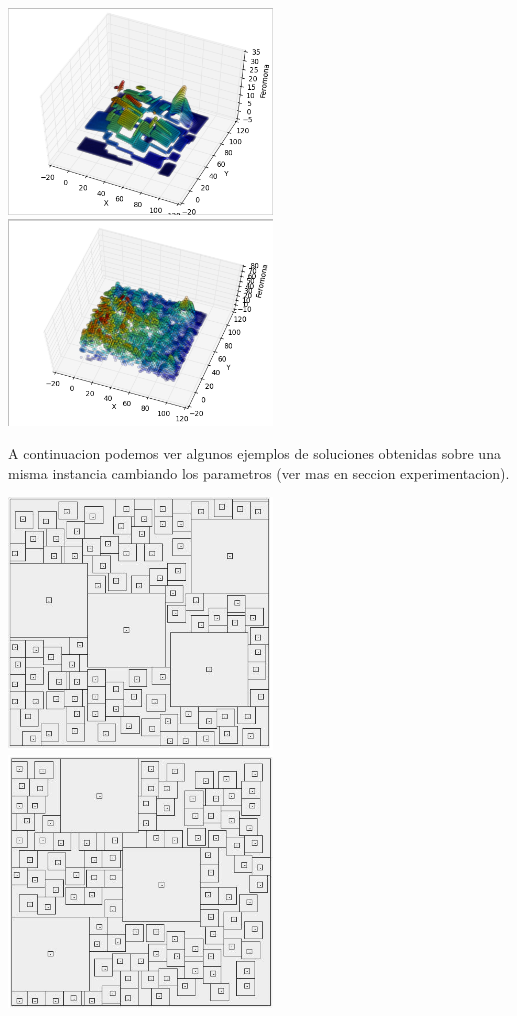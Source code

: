 \begin{center}

\includegraphics[width=7cm]{imagenes/ferov20}
\includegraphics[width=7cm]{imagenes/ferov21}
\end{center}

A continuacion podemos ver algunos ejemplos de soluciones obtenidas sobre una misma instancia cambiando los parametros (ver mas en seccion experimentacion).

\begin{center}

\includegraphics[width=7cm]{imagenes/ejemplo7}
\includegraphics[width=7cm]{imagenes/ejemplo5}
\end{center}


